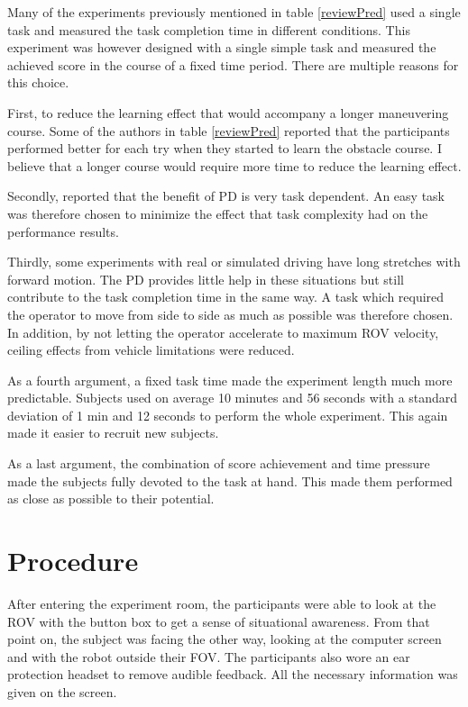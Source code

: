 Many of the experiments previously mentioned in table \ref{reviewPred} used a single task and measured the task completion time in different conditions. This experiment was however designed with a single simple task and measured the achieved score in the course of a fixed time period. There are multiple reasons for this choice.
\restoregeometry

First, to reduce the learning effect that would accompany a longer maneuvering course. Some of the authors in table \ref{reviewPred} reported that the participants performed better for each try when they started to learn the obstacle course. I believe that a longer course would require more time to reduce the learning effect.

Secondly, \citet{Chen2007} reported that the benefit of PD is very task dependent. An easy task was therefore chosen to minimize the effect that task complexity had on the performance results. 

Thirdly, some experiments with real or simulated driving have long stretches with forward motion. The PD provides little help in these situations but still contribute to the task completion time in the same way. A task which required the operator to move from side to side as much as possible was therefore chosen. In addition, by not letting the operator accelerate to maximum ROV velocity, ceiling effects from vehicle limitations were reduced. 

As a fourth argument, a fixed task time made the experiment length much more predictable. Subjects used on average 10 minutes and 56 seconds with a standard deviation of 1 min and 12 seconds to perform the whole experiment. This again made it easier to recruit new subjects. 

As a last argument, the combination of score achievement and time pressure made the subjects fully devoted to the task at hand. This made them performed as close as possible to their potential.

\section{Procedure}

After entering the experiment room, the participants were able to look at the ROV with the button box to get a sense of situational awareness. From that point on, the subject was facing the other way, looking at the computer screen and with the robot outside their FOV. The participants also wore an ear protection headset to remove audible feedback. All the necessary information was given on the screen.

